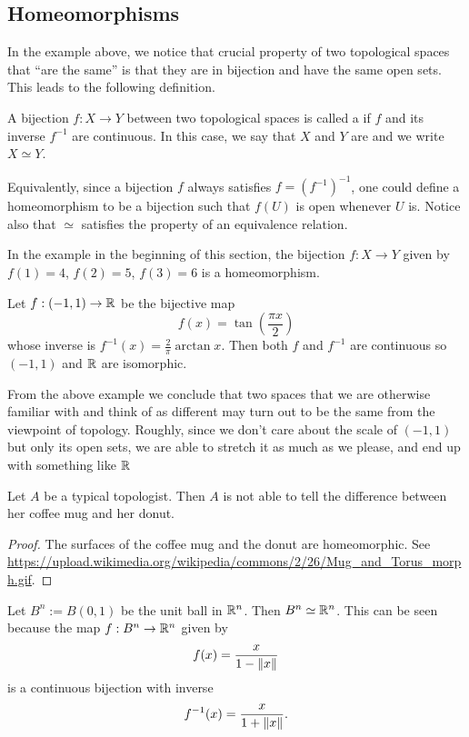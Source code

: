 \subsection{Homeomorphisms}
In the example above, we notice that crucial property of two topological spaces that ``are the same'' is that they are in bijection and have the same open sets. This leads to the following definition.
\begin{defn}
  A bijection $f : X \to Y$ between two topological spaces is called a  if $f$ and its inverse $f^{-1}$ are continuous. In this case, we say that $X$ and $Y$ are  and we write $X \simeq Y$.
\end{defn}
Equivalently, since a bijection $f$ always satisfies $f = (f^{-1})^{-1}$, one could define a homeomorphism to be a bijection such that $f(U)$ is open whenever $U$ is. Notice also that $\simeq$ satisfies the property of an equivalence relation.
\begin{example}
  In the example in the beginning of this section, the bijection $f : X \to Y$ given by $f(1) = 4$, $f(2) = 5$, $f(3) = 6$ is a homeomorphism.
\end{example}
\begin{example}
  Let $f : (-1 , 1) \to \mathbb{R}$ be the bijective map
  \[
    f(x) = \tan \left( \frac{\pi x}{2} \right)
  \]
  whose inverse is $f^{-1}(x) = \tfrac{2}{\pi} \arctan x$. Then both $f$ and $f^{-1}$ are continuous so $(-1,1)$ and $\mathbb{R}$ are isomorphic.
\end{example}
From the above example we conclude that two spaces that we are otherwise familiar with and think of as different may turn out to be the same from the viewpoint of topology. Roughly, since we don't care about the scale of $(-1,1)$ but only its open sets, we are able to stretch it as much as we please, and end up with something like $\mathbb{R}$
\begin{badjoke}
  Let $A$ be a typical topologist. Then $A$ is not able to tell the difference between her coffee mug and her donut.
\end{badjoke}
\begin{proof}
  The surfaces of the coffee mug and the donut are homeomorphic. See \url{https://upload.wikimedia.org/wikipedia/commons/2/26/Mug_and_Torus_morph.gif}.
\end{proof}
\begin{example}
  Let $B^n := B(0,1)$ be the unit ball in $\mathbb{R}^n$. Then $B^n \simeq \mathbb{R}^n$. This can be seen because the map $f : B^n \to \mathbb{R}^n$ given by
  \[
    f(x) = \frac{x}{1-\lVert x \rVert}
  \]
  is a continuous bijection with inverse
  \[
    f^{-1}(x) = \frac{x}{1+\lVert x \rVert}.
  \]
\end{example}
